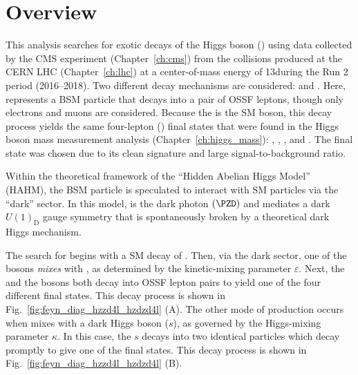 \section{Overview}
This analysis searches for exotic decays of the Higgs boson (\PH) using data collected by the CMS experiment (Chapter~\ref{ch:cms}) from the \pp collisions produced at the CERN LHC (Chapter~\ref{ch:lhc}) at a center-of-mass energy of 13\TeV during the Run 2 period (2016--2018).
Two different decay mechanisms are considered: \htozx and \htoxx.
Here, \PX represents a BSM particle that decays into a pair of OSSF leptons, though only electrons and muons are considered.
Because the \PZ is the SM \PZ boson, this decay process yields the same four-lepton (\fourl) final states that were found in the Higgs boson mass measurement analysis (Chapter~\ref{ch:higgs_mass}):
\foure, \fourmu, \twoetwomu, and \twomutwoe.
The \fourl final state was chosen due to its clean signature and large signal-to-background ratio.

Within the theoretical framework of the ``Hidden Abelian Higgs Model'' (HAHM), the BSM particle \PX is speculated to interact with SM particles via the ``dark'' sector.  %
In this model, \PX is the dark photon $\left( \PZD \right)$ and mediates a dark $U(1)_\text{D}$ gauge symmetry that is spontaneously broken by a theoretical dark Higgs mechanism.

The search for \PZD begins with a SM decay of \htozznostar.
Then, via the dark sector, one of the \PZ bosons \emph{mixes} with \PZD, as determined by the kinetic-mixing parameter $\varepsilon$.
Next, the \PZD and the \PZ bosons both decay into OSSF lepton pairs to yield one of the four different \fourl final states.
This decay process is shown in Fig.~\ref{fig:feyn_diag_hzzd4l_hzdzd4l} (A).
The other mode of \PZD production occurs when \PH mixes with a dark Higgs boson ($s$), as governed by the Higgs-mixing parameter $\mathcal{\kappa}$.  %
In this case, the $s$ decays into two identical \PZD particles which decay promptly to give one of the \fourl final states.
This decay process is shown in Fig.~\ref{fig:feyn_diag_hzzd4l_hzdzd4l} (B).

